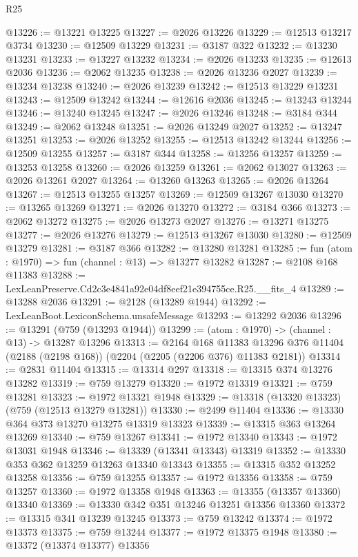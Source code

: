 \begin{lexlean}{R25}
\begin{coremodule}
@13226 := @13221 @13225
@13227 := @2026 @13226
@13229 := @12513 @13217 @3734
@13230 := @12509 @13229
@13231 := @3187 @322
@13232 := @13230 @13231
@13233 := @13227 @13232
@13234 := @2026 @13233
@13235 := @12613 @2036
@13236 := @2062 @13235
@13238 := @2026 @13236 @2027
@13239 := @13234 @13238
@13240 := @2026 @13239
@13242 := @12513 @13229 @13231
@13243 := @12509 @13242
@13244 := @12616 @2036
@13245 := @13243 @13244
@13246 := @13240 @13245
@13247 := @2026 @13246
@13248 := @3184 @344
@13249 := @2062 @13248
@13251 := @2026 @13249 @2027
@13252 := @13247 @13251
@13253 := @2026 @13252
@13255 := @12513 @13242 @13244
@13256 := @12509 @13255
@13257 := @3187 @344
@13258 := @13256 @13257
@13259 := @13253 @13258
@13260 := @2026 @13259
@13261 := @2062 @13027
@13263 := @2026 @13261 @2027
@13264 := @13260 @13263
@13265 := @2026 @13264
@13267 := @12513 @13255 @13257
@13269 := @12509 @13267 @13030
@13270 := @13265 @13269
@13271 := @2026 @13270
@13272 := @3184 @366
@13273 := @2062 @13272
@13275 := @2026 @13273 @2027
@13276 := @13271 @13275
@13277 := @2026 @13276
@13279 := @12513 @13267 @13030
@13280 := @12509 @13279
@13281 := @3187 @366
@13282 := @13280 @13281
@13285 := fun (atom : @1970) => fun (channel : @13) => @13277 @13282
@13287 := @2108 @168 @11383
@13288 := LexLeanPreserve.Cd2c3e4841a92e04df8eef21e394755ce.R25.__fits_4
@13289 := @13288 @2036
@13291 := @2128 (@13289 @1944)
@13292 := LexLeanBoot.LexiconSchema.unsafeMessage
@13293 := @13292 @2036
@13296 := @13291 (@759 (@13293 @1944))
@13299 := (atom : @1970) -> (channel : @13) -> @13287 @13296
@13313 := @2164
    @168
    @11383
    @13296
    @376
    @11404
    (@2188 (@2198 @168))
    (@2204 (@2205 (@2206 @376) @11383 @2181))
@13314 := @2831 @11404
@13315 := @13314 @297
@13318 := @13315 @374 @13276 @13282
@13319 := @759 @13279
@13320 := @1972 @13319
@13321 := @759 @13281
@13323 := @1972 @13321 @1948
@13329 := @13318 (@13320 @13323) (@759 (@12513 @13279 @13281))
@13330 := @2499 @11404
@13336 := @13330 @364 @373 @13270 @13275 @13319 @13323
@13339 := @13315 @363 @13264 @13269
@13340 := @759 @13267
@13341 := @1972 @13340
@13343 := @1972 @13031 @1948
@13346 := @13339 (@13341 @13343) @13319
@13352 := @13330 @353 @362 @13259 @13263 @13340 @13343
@13355 := @13315 @352 @13252 @13258
@13356 := @759 @13255
@13357 := @1972 @13356
@13358 := @759 @13257
@13360 := @1972 @13358 @1948
@13363 := @13355 (@13357 @13360) @13340
@13369 := @13330 @342 @351 @13246 @13251 @13356 @13360
@13372 := @13315 @341 @13239 @13245
@13373 := @759 @13242
@13374 := @1972 @13373
@13375 := @759 @13244
@13377 := @1972 @13375 @1948
@13380 := @13372 (@13374 @13377) @13356

\end{coremodule}
\end{lexlean}
